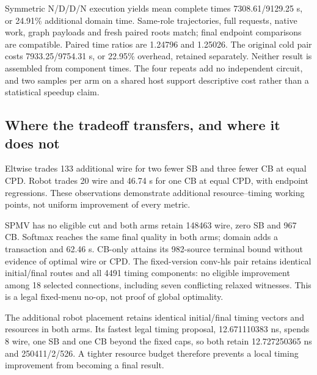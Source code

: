\documentclass[conference,10pt]{IEEEtran}
\begin{document}
Symmetric N/D/D/N execution yields mean complete times 7308.61/9129.25 s, or 24.91\% additional domain time. Same-role trajectories, full requests, native work, graph payloads and fresh paired roots match; final endpoint comparisons are compatible. Paired time ratios are 1.24796 and 1.25026. The original cold pair costs 7933.25/9754.31 s, or 22.95\% overhead, retained separately. Neither result is assembled from component times. The four repeats add no independent circuit, and two samples per arm on a shared host support descriptive cost rather than a statistical speedup claim.

\subsection{Where the tradeoff transfers, and where it does not}
Eltwise trades 133 additional wire for two fewer SB and three fewer CB at equal CPD. Robot trades 20 wire and 46.74 s for one CB at equal CPD, with endpoint regressions. These observations demonstrate additional resource--timing working points, not uniform improvement of every metric.

SPMV has no eligible cut and both arms retain 148463 wire, zero SB and 967 CB. Softmax reaches the same final quality in both arms; domain adds a transaction and 62.46 s. CB-only attains its 982-source terminal bound without evidence of optimal wire or CPD. The fixed-version conv-hls pair retains identical initial/final routes and all 4491 timing components: no eligible improvement among 18 selected connections, including seven conflicting relaxed witnesses. This is a legal fixed-menu no-op, not proof of global optimality.

The additional robot placement retains identical initial/final timing vectors and resources in both arms. Its fastest legal timing proposal, 12.671110383 ns, spends 8 wire, one SB and one CB beyond the fixed caps, so both retain 12.727250365 ns and 250411/2/526. A tighter resource budget therefore prevents a local timing improvement from becoming a final result.
\end{document}
